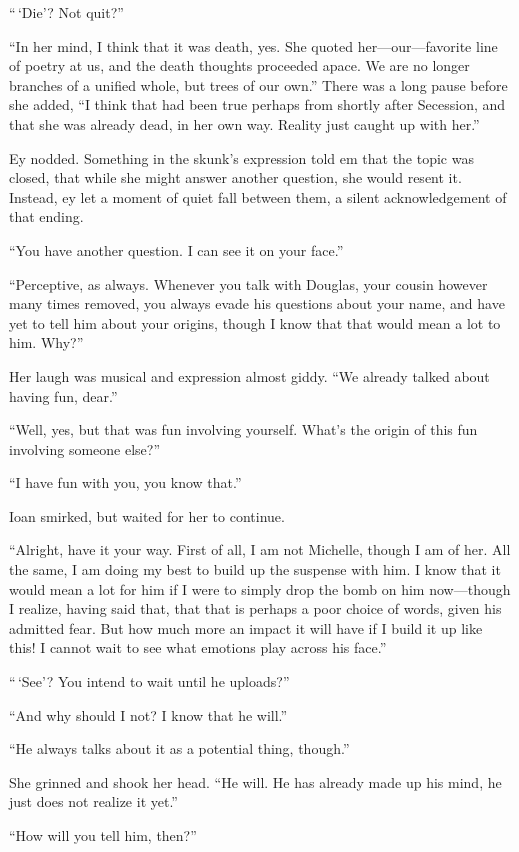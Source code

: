 ``\,`Die'? Not quit?''

``In her mind, I think that it was death, yes. She quoted her---our---favorite line of poetry at us, and the death thoughts proceeded apace. We are no longer branches of a unified whole, but trees of our own.'' There was a long pause before she added, ``I think that had been true perhaps from shortly after Secession, and that she was already dead, in her own way. Reality just caught up with her.''

Ey nodded. Something in the skunk's expression told em that the topic was closed, that while she might answer another question, she would resent it. Instead, ey let a moment of quiet fall between them, a silent acknowledgement of that ending.

``You have another question. I can see it on your face.''

``Perceptive, as always. Whenever you talk with Douglas, your cousin however many times removed, you always evade his questions about your name, and have yet to tell him about your origins, though I know that that would mean a lot to him. Why?''

Her laugh was musical and expression almost giddy. ``We already talked about having fun, dear.''

``Well, yes, but that was fun involving yourself. What's the origin of this fun involving someone else?''

``I have fun with you, you know that.''

Ioan smirked, but waited for her to continue.

``Alright, have it your way. First of all, I am not Michelle, though I am of her. All the same, I am doing my best to build up the suspense with him. I know that it would mean a lot for him if I were to simply drop the bomb on him now---though I realize, having said that, that that is perhaps a poor choice of words, given his admitted fear. But how much more an impact it will have if I build it up like this! I cannot wait to see what emotions play across his face.''

``\,`See'? You intend to wait until he uploads?''

``And why should I not? I know that he will.''

``He always talks about it as a potential thing, though.''

She grinned and shook her head. ``He will. He has already made up his mind, he just does not realize it yet.''

``How will you tell him, then?''

